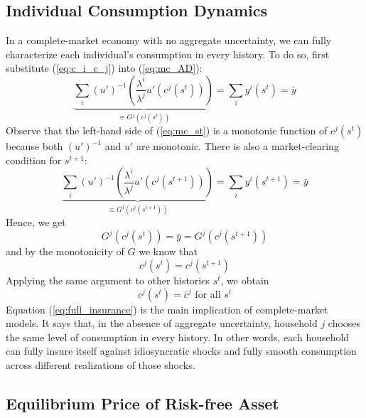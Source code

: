 \documentclass[12pt]{article}
\begin{document}
\subsection{Individual Consumption Dynamics}


In a complete-market economy with no aggregate uncertainty, we can fully characterize each individual's consumption in every history. To do so, first substitute (\ref{eq:c_i_c_j}) into (\ref{eq:mc_AD}):
\begin{equation} \label{eq:mc_st}
 \underbrace{\sum_i (u')^{-1} \left(\frac{\lambda^i}{\lambda^j}u'(c^j(s^t))\right)}_{\equiv G^j(c^j(s^t))} = \sum_i y^i(s^t) = \bar{y}
\end{equation}
Observe that the left-hand side of (\ref{eq:mc_st}) is a monotonic function of $c^j(s^t)$ because both $(u')^{-1}$ and $u'$ are monotonic. There is also a market-clearing condition for $s^{t+1}$:
\begin{equation}
	\underbrace{\sum_i (u')^{-1} \left(\frac{\lambda^i}{\lambda^j}u'(c^j(s^{t+1}))\right)}_{\equiv G^j(c^j(s^{t+1}))} = \sum_i y^i(s^{t+1}) = \bar{y}
\end{equation}
Hence, we get
\[G^j(c^j(s^t)) = \bar{y} = G^j(c^j(s^{t+1}))\]
and by the monotonicity of $G$ we know that
\begin{equation}
	c^j(s^t) = c^j(s^{t+1})
\end{equation}
Applying the same argument to other histories $s^t$, we obtain 
\begin{equation} \label{eq:full_insurance}
	c^j(s^t) = \bar{c}^j \text{ for all $s^t$}
\end{equation}
Equation (\ref{eq:full_insurance}) is the main implication of complete-market models. It says that, in the absence of aggregate uncertainty, household $j$ chooses the same level of consumption in every history. In other words, each household can fully insure itself against idiosyncratic shocks and fully smooth consumption across different realizations of those shocks.

\subsection{Equilibrium Price of Risk-free Asset}
\end{document}
